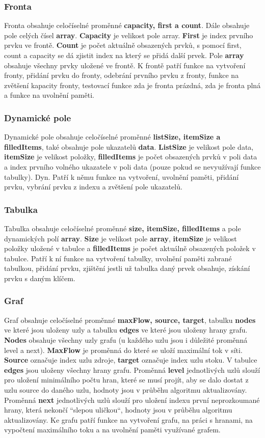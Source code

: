 \documentclass[12pt,a4paper]{article}
\begin{document}
	 \subsubsection{Fronta}
	 Fronta obsahuje celočíselné proměnné \textbf{capacity, first a count}. Dále obsahuje pole celých čísel \textbf{array}. \textbf{Capacity} je velikost pole array. \textbf{First} je index prvního prvku ve frontě. \textbf{Count} je počet aktuálně obsazených prvků, s pomocí first, count a capacity se dá zjistit index na který se přidá další prvek. Pole \textbf{array} obsahuje všechny prvky uložené ve frontě. K frontě patří funkce na vytvoření fronty, přidání prvku do fronty, odebrání prvního prvku z fronty, funkce na zvětšení kapacity fronty, testovací funkce zda je fronta prázdná, zda je fronta plná a funkce na uvolnění paměti.
	 \subsubsection{Dynamické pole}
	 Dynamické pole obsahuje celočíselné proměnné \textbf{listSize, itemSize a filledItems}, také obsahuje pole ukazatelů \textbf{data}. \textbf{ListSize} je velikost pole data, \textbf{itemSize} je velikost položky, \textbf{filledItems} je počet obsazených prvků v poli data a index prvního volného ukazatele v poli data (pouze pokud se nevyužívají funkce tabulky). Dyn. Patří k němu funkce na vytvoření, uvolnění paměti, přidání prvku, vybrání prvku z indexu a zvětšení pole ukazatelů.
	 \subsubsection{Tabulka}
	 Tabulka obsahuje celočíselné proměnné \textbf{size, itemSize, filledItems} a pole dynamických polí \textbf{array}. \textbf{Size} je velikost pole \textbf{array}, \textbf{itemSize} je velikost položky uložené v tabulce a \textbf{filledItems} je počet aktuálně obsazených položek v tabulce. Patří k ní funkce na vytvoření tabulky, uvolnění paměti zabrané tabulkou, přidání prvku, zjištění jestli už tabulka daný prvek obsahuje, získání prvku s daným klíčem.
	 \subsubsection{Graf}
	 Graf obsahuje celočíselné proměnné \textbf{maxFlow, source, target}, tabulku \textbf{nodes} ve které jsou uloženy uzly a tabulku \textbf{edges} ve které jsou uloženy hrany grafu. \textbf{Nodes} obsahuje všechny uzly grafu (u každého uzlu jsou i důležité proměnná level a next). \textbf{MaxFlow} je proměnná do které se uloží maximální tok v síti. \textbf{Source} označuje index uzlu zdroje, \textbf{target} označuje index uzlu stoku. V tabulce \textbf{edges} jsou uloženy všechny hrany grafu. Proměnná \textbf{level} jednotlivých uzlů slouží pro uložení minimálního počtu hran, které se musí projít, aby se dalo dostat z uzlu source do daného uzlu, hodnoty jsou v průběhu algoritmu aktualizovány. Proměnná \textbf{next} jednotlivých uzlů slouží pro uložení indexu první neprozkoumané hrany, která nekončí “slepou uličkou“, hodnoty jsou v průběhu algoritmu aktualizovány. Ke grafu patří funkce na vytvoření grafu, na práci s hranami, na vypočtení maximálního toku a na uvolnění paměti využívané grafem.
\end{document}
